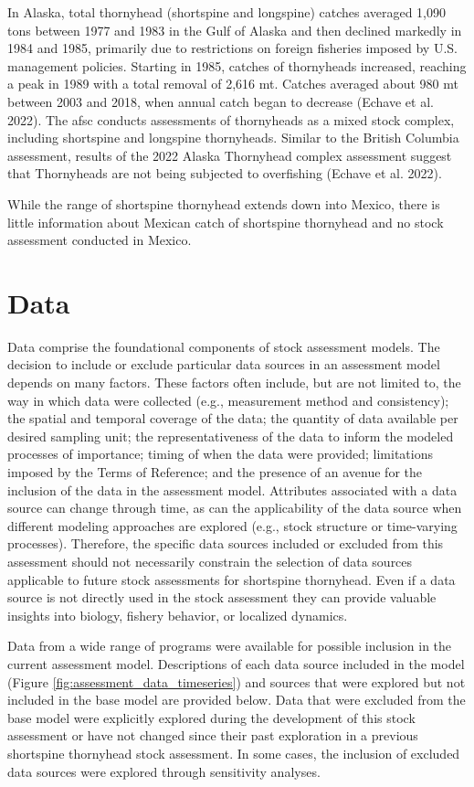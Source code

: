 \documentclass[11pt,
  letterpaper,
]{article}
\begin{document}
In Alaska, total thornyhead (shortspine and longspine) catches averaged 1,090 tons between 1977 and 1983 in the Gulf of Alaska and then declined markedly in 1984 and 1985, primarily due to restrictions on foreign fisheries imposed by U.S. management policies. Starting in 1985, catches of thornyheads increased, reaching a peak in 1989 with a total removal of 2,616 mt. Catches averaged about 980 mt between 2003 and 2018, when annual catch began to decrease (Echave et al. 2022). The \gls{afsc} conducts assessments of thornyheads as a mixed stock complex, including shortspine and longspine thornyheads. Similar to the British Columbia assessment, results of the 2022 Alaska Thornyhead complex assessment suggest that Thornyheads are not being subjected to overfishing (Echave et al. 2022).

While the range of shortspine thornyhead extends down into Mexico, there is little information about Mexican catch of shortspine thornyhead and no stock assessment conducted in Mexico.

\hypertarget{data}{%
\section{Data}\label{data}}

Data comprise the foundational components of stock assessment models. The decision to include or exclude particular data sources in an assessment model depends on many factors. These factors often include, but are not limited to, the way in which data were collected (e.g., measurement method and consistency); the spatial and temporal coverage of the data; the quantity of data available per desired sampling unit; the representativeness of the data to inform the modeled processes of importance; timing of when the data were provided; limitations imposed by the Terms of Reference; and the presence of an avenue for the inclusion of the data in the assessment model. Attributes associated with a data source can change through time, as can the applicability of the data source when different modeling approaches are explored (e.g., stock structure or time-varying processes). Therefore, the specific data sources included or excluded from this assessment should not necessarily constrain the selection of data sources applicable to future stock assessments for shortspine thornyhead. Even if a data source is not directly used in the stock assessment they can provide valuable insights into biology, fishery behavior, or localized dynamics.

Data from a wide range of programs were available for possible inclusion in the current assessment model. Descriptions of each data source included in the model (Figure \ref{fig:assessment_data_timeseries}) and sources that were explored but not included in the base model are provided below. Data that were excluded from the base model were explicitly explored during the development of this stock assessment or have not changed since their past exploration in a previous shortspine thornyhead stock assessment. In some cases, the inclusion of excluded data sources were explored through sensitivity analyses.
\end{document}
